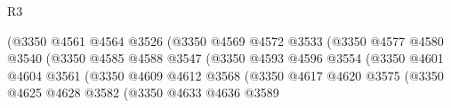 \begin{lexlean}{R3}
\begin{coremodule}
                                                  (@3350
                                                    @4561
                                                    @4564
                                                    @3526
                                                    (@3350
                                                      @4569
                                                      @4572
                                                      @3533
                                                      (@3350
                                                        @4577
                                                        @4580
                                                        @3540
                                                        (@3350
                                                          @4585
                                                          @4588
                                                          @3547
                                                          (@3350
                                                            @4593
                                                            @4596
                                                            @3554
                                                            (@3350
                                                              @4601
                                                              @4604
                                                              @3561
                                                              (@3350
                                                                @4609
                                                                @4612
                                                                @3568
                                                                (@3350
                                                                  @4617
                                                                  @4620
                                                                  @3575
                                                                  (@3350
                                                                    @4625
                                                                    @4628
                                                                    @3582
                                                                    (@3350
                                                                      @4633
                                                                      @4636
                                                                      @3589

\end{coremodule}
\end{lexlean}
